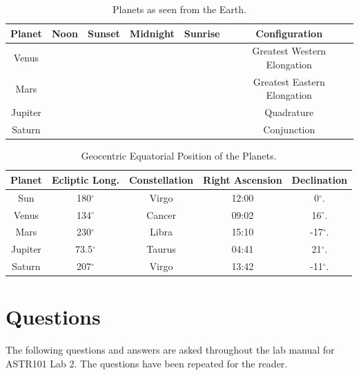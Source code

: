 \documentclass{article}
\newcommand{\cmark}{\ding{51}}
\begin{document}
\begin{table}[h!]
\begin{center}
\begin{tabular}{| c | c | c | c | c | c |}
\hline
Planet & Noon & Sunset & Midnight & Sunrise & Configuration\\
\hline
\hline
Venus & \cmark & & & \cmark & Greatest Western Elongation \\
Mars & \cmark & \cmark & & & Greatest Eastern Elongation\\
Jupiter & & & \cmark & \cmark & Quadrature\\
Saturn & \cmark & \cmark & & & Conjunction \\
\hline
\end{tabular}
\end{center}
\caption{Planets as seen from the Earth.\label{tab:tod}}
\end{table}

\begin{table}[h!]
\begin{center}
\begin{tabular}{| c | c | c | c | c | }
\hline
Planet & Ecliptic Long. & Constellation & Right Ascension & Declination\\
\hline
\hline
Sun & 180$^\circ$ & Virgo & 12:00 & 0$^\circ$. \\
Venus & 134$^\circ$ & Cancer & 09:02 & 16$^\circ$. \\
Mars & 230$^\circ$ & Libra & 15:10 & -17$^\circ$. \\
Jupiter & 73.5$^\circ$ & Taurus & 04:41 & 21$^\circ$. \\
Saturn & 207$^\circ$ & Virgo & 13:42 & -11$^\circ$. \\
\hline
\end{tabular}
\end{center}
\caption{Geocentric Equatorial Position of the Planets.\label{tab:pos}}
\end{table}


\section{Questions}

The following questions and answers are asked throughout the lab manual for ASTR101 Lab 2. The
questions have been repeated for the reader.
\end{document}
